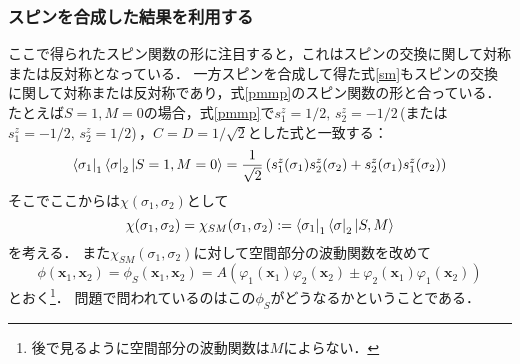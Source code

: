 \documentclass[a4paper,11pt]{jsarticle}
\begin{document}
\subsubsection{スピンを合成した結果を利用する}
ここで得られたスピン関数の形に注目すると，これはスピンの交換に関して対称または反対称となっている．
一方スピンを合成して得た式\eqref{sm}もスピンの交換に関して対称または反対称であり，式\eqref{pmmp}のスピン関数の形と合っている．
たとえば$S=1,M=0$の場合，式\eqref{pmmp}で$s^z_1=1/2,\,s^z_2=-1/2$\,(または$s^z_1=-1/2,\,s^z_2=1/2$)\,，$C=D=1/\sqrt{2}$とした式と一致する：
\begin{equation}
  \bra{\sigma_1}_1\bra{\sigma}_2 \ket{S=1,M=0} =  \frac{1}{\sqrt{2}} \left(s^z_1(\sigma_1)s^z_2(\sigma_2) + s^z_2(\sigma_1)s^z_1(\sigma_2)\right)
\end{equation}
そこでここからは$\chi(\sigma_1, \sigma_2)$として
\begin{equation}
  \chi(\sigma_1, \sigma_2) = \chi_{SM}(\sigma_1,\sigma_2) := \bra{\sigma_1}_1\bra{\sigma}_2 \ket{S,M}
\end{equation}
を考える．
また$\chi_{SM}(\sigma_1,\sigma_2)$に対して空間部分の波動関数を改めて
\begin{equation}
  \phi(\bm{x}_1, \bm{x}_2) = \phi_S(\bm{x}_1, \bm{x}_2) = A\left(\varphi_1(\bm{x}_1) \varphi_2(\bm{x}_2) \pm \varphi_2(\bm{x}_1) \varphi_1(\bm{x}_2)\right)
\end{equation}
とおく\footnote{後で見るように空間部分の波動関数は$M$によらない．}．
問題で問われているのはこの$\phi_S$がどうなるかということである．
\end{document}

